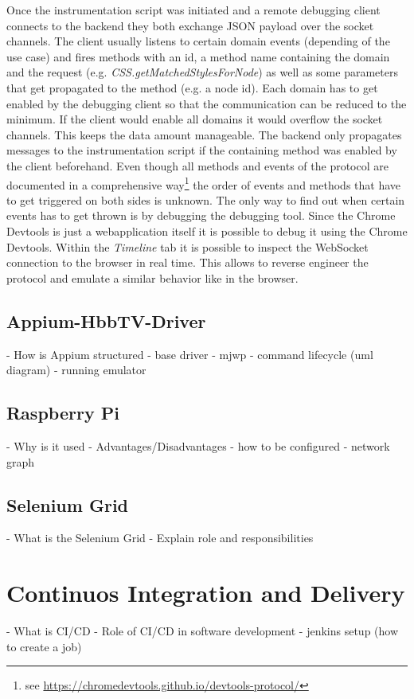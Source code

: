 Once the instrumentation script was initiated and a remote debugging client connects to the backend
they both exchange JSON payload over the socket channels. The client usually listens to certain
domain events (depending of the use case) and fires methods with an id, a method name containing
the domain and the request (e.g. \textit{CSS.getMatchedStylesForNode}) as well as some parameters
that get propagated to the method (e.g. a node id). Each domain has to get enabled by the debugging
client so that the communication can be reduced to the minimum. If the client would enable all
domains it would overflow the socket channels. This keeps the data amount manageable. The backend
only propagates messages to the instrumentation script if the containing method was enabled by
the client beforehand. Even though all methods and events of the protocol are documented in a
comprehensive way\footnote{see \url{https://chromedevtools.github.io/devtools-protocol/}} the order
of events and methods that have to get triggered on both sides is unknown. The only way to find
out when certain events has to get thrown is by debugging the debugging tool. Since the Chrome
Devtools is just a webapplication itself it is possible to debug it using the Chrome Devtools.
Within the \textit{Timeline} tab it is possible to inspect the WebSocket connection to the browser
in real time. This allows to reverse engineer the protocol and emulate a similar behavior like
in the browser.

\subsection{Appium-HbbTV-Driver\label{sec:appiumhbbtvdriver}}

- How is Appium structured
- base driver
- mjwp
- command lifecycle (uml diagram)
- running emulator

\subsection{Raspberry Pi\label{sec:pi}}

- Why is it used
- Advantages/Disadvantages
- how to be configured
- network graph

\subsection{Selenium Grid\label{sec:grid}}

- What is the Selenium Grid
- Explain role and responsibilities

\section{Continuos Integration and Delivery\label{sec:cicd}}

- What is CI/CD
- Role of CI/CD in software development
- jenkins setup (how to create a job)

